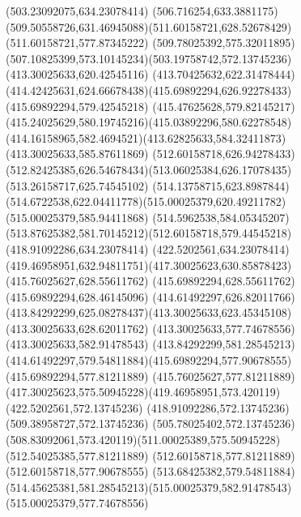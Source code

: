 {{{	\lineto(503.23092075,634.23078414)
	\curveto(506.716254,633.3881175)(509.50558726,631.46945088)(511.60158721,628.52678429)
	\lineto(511.60158721,577.87345222)
	\curveto(509.78025392,575.32011895)(507.10825399,573.10145234)(503.19758742,572.13745236)
	\moveto(413.30025633,620.42545116)
	\curveto(413.70425632,622.31478444)(414.42425631,624.66678438)(415.69892294,626.92278433)
	\lineto(415.69892294,579.42545218)
	\curveto(415.47625628,579.82145217)(415.24025629,580.19745216)(415.03892296,580.62278548)
	\curveto(414.16158965,582.4694521)(413.62825633,584.32411873)(413.30025633,585.87611869)
	\closepath
	\moveto(512.60158718,626.94278433)
	\curveto(512.82425385,626.54678434)(513.06025384,626.17078435)(513.26158717,625.74545102)
	\curveto(514.13758715,623.8987844)(514.6722538,622.04411778)(515.00025379,620.49211782)
	\lineto(515.00025379,585.94411868)
	\curveto(514.5962538,584.05345207)(513.87625382,581.70145212)(512.60158718,579.44545218)
	\closepath
	\moveto(418.91092286,634.23078414)
	\lineto(422.5202561,634.23078414)
	\curveto(419.46958951,632.94811751)(417.30025623,630.85878423)(415.76025627,628.55611762)
	\lineto(415.69892294,628.55611762)
	\lineto(415.69892294,628.46145096)
	\curveto(414.61492297,626.82011766)(413.84292299,625.08278437)(413.30025633,623.45345108)
	\lineto(413.30025633,628.62011762)
	\closepath
	\moveto(413.30025633,577.74678556)
	\lineto(413.30025633,582.91478543)
	\curveto(413.84292299,581.28545213)(414.61492297,579.54811884)(415.69892294,577.90678555)
	\lineto(415.69892294,577.81211889)
	\lineto(415.76025627,577.81211889)
	\curveto(417.30025623,575.50945228)(419.46958951,573.420119)(422.5202561,572.13745236)
	\lineto(418.91092286,572.13745236)
	\closepath
	\moveto(509.38958727,572.13745236)
	\lineto(505.78025402,572.13745236)
	\curveto(508.83092061,573.420119)(511.00025389,575.50945228)(512.54025385,577.81211889)
	\lineto(512.60158718,577.81211889)
	\lineto(512.60158718,577.90678555)
	\curveto(513.68425382,579.54811884)(514.45625381,581.28545213)(515.00025379,582.91478543)
	\lineto(515.00025379,577.74678556)
	\closepath
}
}
\ifdefined\MKQRenderDeathSaves\else
{
}}
